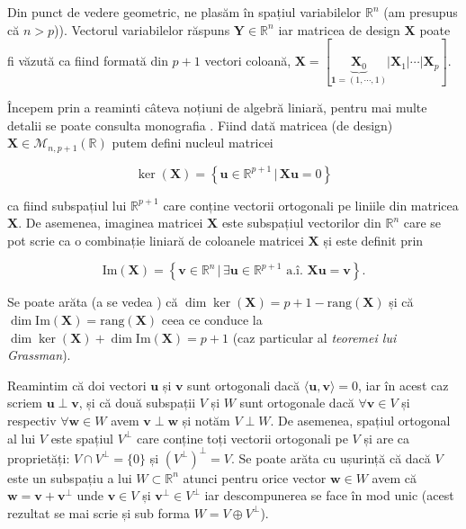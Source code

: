 \documentclass[]{article}
\begin{document}
Din punct de vedere geometric, ne plasăm în spațiul variabilelor
\(\mathbb{R}^n\) (am presupus că \(n>p\))). Vectorul variabilelor
răspuns \(\boldsymbol Y\in \mathbb{R}^n\) iar matricea de design
\(\boldsymbol{X}\) poate fi văzută ca fiind formată din \(p+1\) vectori
coloană,
\(\boldsymbol{X} = \left[\underbrace{\boldsymbol X_0}_{\mathbf{1} = (1,\cdots,1)}|\boldsymbol X_1|\cdots|\boldsymbol X_p\right]\).

Începem prin a reaminti câteva noțiuni de algebră liniară, pentru mai
multe detalii se poate consulta monografia \citep{Turtoi2000}. Fiind
dată matricea (de design)
\(\boldsymbol{X}\in\mathcal{M}_{n,p+1}(\mathbb{R})\) putem defini
nucleul matricei

\[
\ker(\boldsymbol{X}) = \left\{\boldsymbol u\in\mathbb{R}^{p+1}\,|\, \boldsymbol{X}\boldsymbol u = 0\right\}
\]

ca fiind subspațiul lui \(\mathbb{R}^{p+1}\) care conține vectorii
ortogonali pe liniile din matricea \(\boldsymbol{X}\). De asemenea,
imaginea matricei \(\boldsymbol{X}\) este subspațiul vectorilor din
\(\mathbb{R}^n\) care se pot scrie ca o combinație liniară de coloanele
matricei \(\boldsymbol{X}\) și este definit prin

\[
\mathrm{Im}(\boldsymbol{X}) = \left\{\boldsymbol v\in\mathbb{R}^{n}\,|\,\exists \boldsymbol u\in\mathbb{R}^{p+1} \text{ a.î. } \boldsymbol{X}\boldsymbol u = \boldsymbol v\right\}.
\]

Se poate arăta (a se vedea \citep[Capitolul 1]{Turtoi2000}) că
\(\dim \ker(\boldsymbol{X}) = p + 1 - \mathrm{rang}(\boldsymbol{X})\) și
că \(\dim \mathrm{Im}(\boldsymbol{X}) = \mathrm{rang}(\boldsymbol{X})\)
ceea ce conduce la
\(\dim \ker(\boldsymbol{X}) + \dim \mathrm{Im}(\boldsymbol{X}) = p+1\)
(caz particular al \emph{teoremei lui Grassman}).

Reamintim că doi vectori \(\boldsymbol u\) și \(\boldsymbol v\) sunt
ortogonali dacă \(\langle \boldsymbol u, \boldsymbol v\rangle = 0\), iar
în acest caz scriem \(\boldsymbol u \perp \boldsymbol v\), și că două
subspații \(V\) și \(W\) sunt ortogonale dacă
\(\forall \boldsymbol v \in V\) și respectiv
\(\forall \boldsymbol w \in W\) avem
\(\boldsymbol v\perp \boldsymbol w\) și notăm \(V\perp W\). De asemenea,
spațiul ortogonal al lui \(V\) este spațiul \(V^{\perp}\) care conține
toți vectorii ortogonali pe \(V\) și are ca proprietăți:
\(V\cap V^{\perp} = \{0\}\) și \(\left(V^{\perp}\right)^\perp = V\). Se
poate arăta cu ușurință că dacă \(V\) este un subspațiu a lui
\(W\subset\mathbb{R}^n\) atunci pentru orice vector
\(\boldsymbol w\in W\) avem că
\(\boldsymbol w = \boldsymbol v + \boldsymbol v^\perp\) unde
\(\boldsymbol v\in V\) și \(\boldsymbol v^\perp\in V^\perp\) iar
descompunerea se face în mod unic (acest rezultat se mai scrie și sub
forma \(W = V\oplus V^\perp\)).
\end{document}
